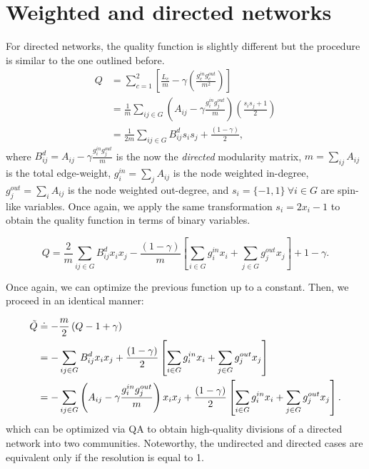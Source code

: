 \documentclass[pdflatex,sn-mathphys-num]{sn-jnl}%
\begin{document}
\setcounter{equation}{0}
\renewcommand{\theequation}{S2.\arabic{equation}}
\section{Weighted and directed networks} \label{app:B}
For directed networks, the quality function is slightly different but the procedure is similar to the one outlined before.
\begin{equation} \label{eq_B:ising_dir}
    \begin{split}
        Q & = \sum_{c=1}^{2}\left[ \frac{L_c}{m} - \gamma \left(\frac{g_c^{in}g_c^{out}}{m^2}\right)\right] \\
          & = \frac{1}{m} \sum_{ij\in G}\left( A_{ij} - \gamma \frac{g_i^{in} g_j^{out}}{m} \right) \left(\frac{s_i s_j + 1}{2}\right)\\
          & = \frac{1}{2m} \sum_{ij\in G} B_{ij}^{d} s_i s_j + \frac{(1-\gamma)}{2},
    \end{split}
\end{equation} where $B_{ij}^d = A_{ij} - \gamma \frac{g_i^{in} g_j^{out}}{m}$ is the now the \textit{directed} modularity matrix, $m=\sum_{ij}A_{ij}$ is the total edge-weight, $g_i^{in}=\sum_j A_{ij}$ is the node weighted in-degree, $g_j^{out}=\sum_i A_{ij}$ is the node weighted out-degree, and $s_i = \{-1,1\} \ \forall i \in G$ are spin-like variables. Once again, we apply the same transformation $s_i=2x_i-1$ to obtain the quality function in terms of binary variables.

\begin{equation} \label{eq_B:QUBO_dir}
    Q = \frac{2}{m}\sum_{ij\in G} B_{ij}^d x_i x_j - \frac{(1-\gamma)}{m}\left[\sum_{i\in G} g_{i}^{in} x_i + \sum_{j\in G} g_{j}^{out} x_j\right] + 1-\gamma.
\end{equation}

Once again, we can optimize the previous function up to a constant. Then, we proceed in an identical manner:

\begin{equation} \label{eq_B:QUBO_dir_optim}
    \begin{split}
        \Tilde{Q} & \doteq - \frac{m}{2} \left(Q - 1 + \gamma \right) \\
                  & = -\sum_{ij\in G} B_{ij}^d x_i x_j + \frac{(1-\gamma)}{2}\left[\sum_{i\in G} g_{i}^{in} x_i + \sum_{j\in G} g_{j}^{out} x_j \right]\\
                  & = -\sum_{ij\in G} \left( A_{ij} - \gamma \frac{g_i^{in} g_j^{out}}{m} \right) x_i x_j + \frac{(1-\gamma)}{2}\left[\sum_{i\in G} g_{i}^{in} x_i + \sum_{j\in G} g_{j}^{out} x_j \right].
    \end{split}
\end{equation} which can be optimized via QA to obtain high-quality divisions of a directed network into two communities. Noteworthy, the undirected and directed cases are equivalent only if the resolution is equal to 1. 
\end{document}
